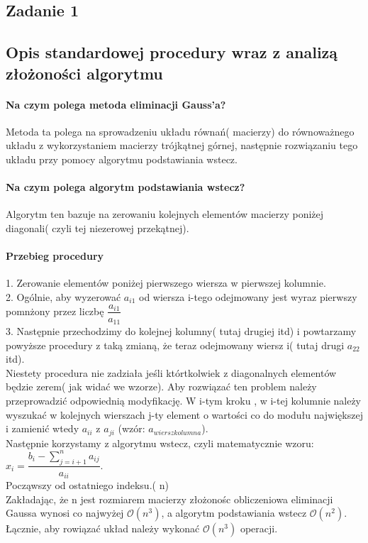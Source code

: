 \documentclass[11pt]{article}
\begin{document}
\begin{flushleft}
\section{Zadanie 1}
\subsection{Opis standardowej procedury wraz z analizą złożoności algorytmu}
\paragraph{Na czym polega metoda eliminacji Gauss'a?}
Metoda ta polega na sprowadzeniu układu równań( macierzy) do równoważnego układu z wykorzystaniem macierzy trójkątnej górnej,  następnie rozwiązaniu tego układu przy pomocy algorytmu podstawiania wstecz.
\paragraph{Na czym polega algorytm podstawiania wstecz?}
Algorytm ten bazuje na zerowaniu kolejnych elementów macierzy poniżej diagonali( czyli tej niezerowej przekątnej).
\paragraph{Przebieg procedury}  1. Zerowanie elementów poniżej pierwszego wiersza w pierwszej kolumnie.\\2. Ogólnie, aby wyzerować $a_{i1}$ od wiersza i-tego odejmowany jest wyraz pierwszy pomnżony przez liczbę $\dfrac{a_{i1}}{a_{11}}$ \\ 3. Następnie przechodzimy do kolejnej kolumny( tutaj drugiej itd) i powtarzamy powyższe procedury z taką zmianą, że teraz odejmowany wiersz i( tutaj drugi $a_{22}$ itd).\\
Niestety procedura nie zadziała jeśli którtkolwiek z diagonalnych elementów będzie zerem( jak widać we wzorze). Aby rozwiązać ten problem należy przeprowadzić odpowiednią modyfikację. W i-tym kroku , w i-tej kolumnie należy wyszukać w kolejnych wierszach j-ty element o wartości co do modułu największej i zamienić wtedy $a_{ii}$ z $ a_{ji}$ (wzór: $a_{wierszkolumna}$).\\Następnie korzystamy z algorytmu wstecz, czyli matematycznie wzoru: $x_i = \dfrac{b_i-\sum^n_{j=i+1} a_{ij}}{a_{ii}}$.\\ 
Począwszy od ostatniego indeksu.( n)\\
Zakładając, że n jest rozmiarem macierzy złożonośc obliczeniowa eliminacji Gaussa wynosi co najwyżej $\mathcal{O}(n^3)$, a algorytm podstawiania wstecz $\mathcal{O}(n^2)$. Łącznie, aby rowiązać układ należy wykonać $\mathcal{O}(n^3)$ operacji.

\end{flushleft}
\end{document}
